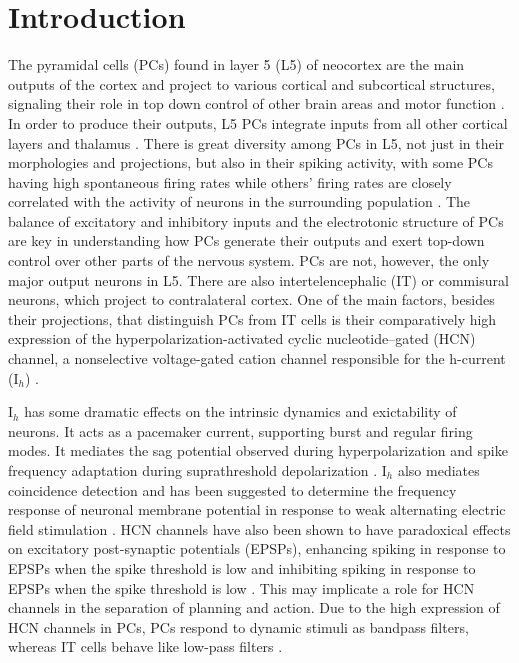 \documentclass[utf8]{frontiersSCNS} %
\begin{document}
\section{Introduction}
The pyramidal cells (PCs) found in layer 5 (L5) of neocortex are the main outputs of the cortex and project to various cortical 
and subcortical structures, signaling their role in top down control of other brain areas and 
motor function \citep{Levesque1996-hf, Veinante2000-gg, Hattox2007-km, Aronoff2010-do, Harris2015-te, Naka2016-rn}.
In order to produce their outputs, L5 PCs integrate inputs from all other cortical layers and thalamus \citep{Agmon1992-mi, 
Meyer2010-pe, Wimmer2010-lq, Oberlaender2012-fh, Rah2013-kr, Markram2015-zg}. There is great diversity among PCs in L5, not just
in their  morphologies and projections, but also in their spiking activity, with some PCs having high spontaneous firing rates while 
others' firing rates are closely correlated with the activity of neurons in the surrounding population \citep{Markram2015-zg}.
The balance of excitatory and inhibitory inputs and the electrotonic structure of PCs are key in understanding how PCs generate their
outputs and exert top-down control over other parts of the nervous system.  PCs are not, however, the only major output neurons in L5.
There are also intertelencephalic (IT) or commisural neurons, which project to contralateral cortex.  One of the main factors, besides their
projections, that distinguish PCs from IT cells is their comparatively high expression of the hyperpolarization-activated cyclic 
nucleotide–gated (HCN) channel, a nonselective voltage-gated cation channel responsible for the h-current (I$_h$) \citep{Oswald2013-lh}.

I$_h$ has some dramatic effects on the intrinsic dynamics and exictability of neurons.  It acts as a pacemaker current, supporting burst
and regular firing modes.  It mediates the sag potential observed during hyperpolarization and spike frequency adaptation during
suprathreshold depolarization \citep{Robinson2003-uc, Oswald2013-lh}. I$_h$ also mediates coincidence detection \citep{Das2015-mh, Dewell2019-ra} 
and has been suggested to determine the frequency response of neuronal membrane potential in response to weak 
alternating electric field stimulation \citep{Toloza2018-vh}.  HCN channels have also been shown to have paradoxical effects on 
excitatory post-synaptic potentials (EPSPs), enhancing spiking in response to EPSPs when the spike threshold is low and inhibiting 
spiking in response to EPSPs when the spike threshold is low \citep{George2009-ad}.  This may implicate a role for HCN channels in the 
separation of planning and action.  Due to the high expression of HCN channels in PCs, PCs respond to dynamic stimuli as bandpass filters, 
whereas IT cells behave like low-pass filters \citep{Dembrow2010-lb}.
\end{document}
